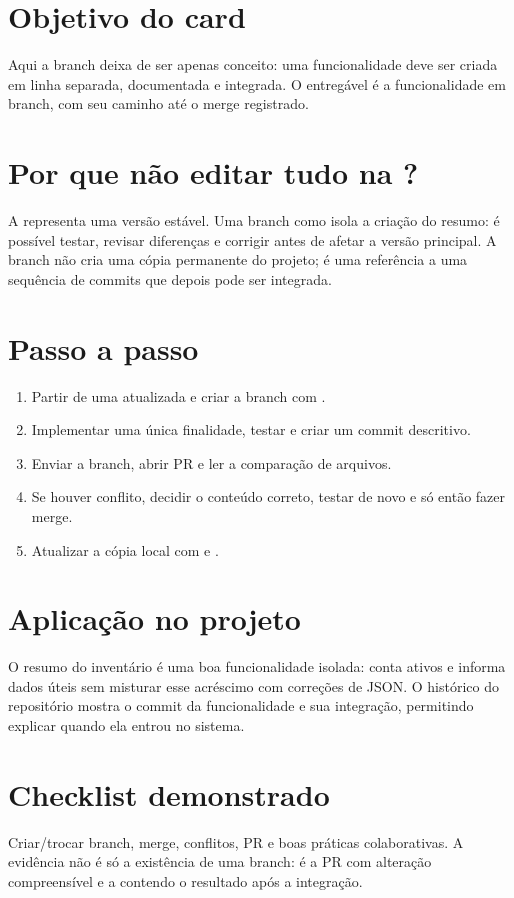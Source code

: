 \documentclass[11pt,a4paper]{article}
\begin{document}
\section*{Objetivo do card}
Aqui a branch deixa de ser apenas conceito: uma funcionalidade deve ser criada em linha separada, documentada e integrada. O entregável é a funcionalidade em branch, com seu caminho até o merge registrado.
\section*{Por que não editar tudo na ?}
A  representa uma versão estável. Uma branch como  isola a criação do resumo: é possível testar, revisar diferenças e corrigir antes de afetar a versão principal. A branch não cria uma cópia permanente do projeto; é uma referência a uma sequência de commits que depois pode ser integrada.
\section*{Passo a passo}
\begin{enumerate}
\item Partir de uma  atualizada e criar a branch com .
\item Implementar uma única finalidade, testar e criar um commit descritivo.
\item Enviar a branch, abrir PR e ler a comparação de arquivos.
\item Se houver conflito, decidir o conteúdo correto, testar de novo e só então fazer merge.
\item Atualizar a cópia local com  e .
\end{enumerate}
\section*{Aplicação no projeto}
O resumo do inventário é uma boa funcionalidade isolada: conta ativos e informa dados úteis sem misturar esse acréscimo com correções de JSON. O histórico do repositório mostra o commit da funcionalidade e sua integração, permitindo explicar quando ela entrou no sistema.
\section*{Checklist demonstrado}
Criar/trocar branch, merge, conflitos, PR e boas práticas colaborativas. A evidência não é só a existência de uma branch: é a PR com alteração compreensível e a  contendo o resultado após a integração.
\end{document}
